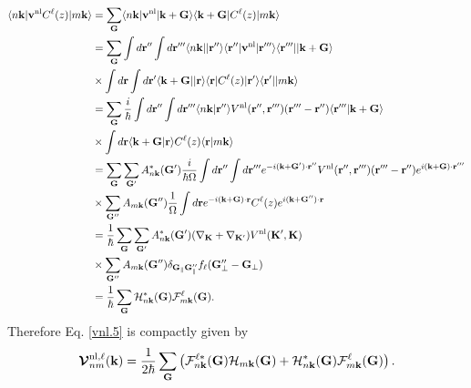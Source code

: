\documentclass[letterpaper,aps]{revtex4}
\begin{document}
\begin{align}\label{vnl.12}
\langle n\mathbf{k} |
\mathbf{v}^\mathrm{nl}
C^\ell(z) | m\mathbf{k} \rangle
&=\sum_{\mathbf{G}}
\langle n\mathbf{k} |
\mathbf{v}^\mathrm{nl} 
| \mathbf{k}+\mathbf{G} \rangle
\langle \mathbf{k}+\mathbf{G} |C^\ell(z)
| m\mathbf{k} \rangle
\nonumber\\
&=\sum_{\mathbf{G}}
\int d\mathbf{r}'' 
\int d\mathbf{r}''' 
\langle n\mathbf{k} |
| \mathbf{r}'' \rangle\langle \mathbf{r}'' | 
\mathbf{v}^\mathrm{nl} 
| \mathbf{r}''' \rangle\langle \mathbf{r}''' | 
| \mathbf{k}+\mathbf{G} \rangle
\nonumber\\
&\times 
\int d\mathbf{r} 
\int d\mathbf{r}' 
\langle \mathbf{k}+\mathbf{G} |
| \mathbf{r} \rangle\langle \mathbf{r} |  
C^\ell(z) 
| \mathbf{r}' \rangle\langle \mathbf{r}' |
| m\mathbf{k} \rangle
\nonumber\\
&=\sum_{\mathbf{G}}
\frac{i}{\hbar}
\int d\mathbf{r}'' 
\int d\mathbf{r}''' 
\langle {n\mathbf{k}} | {\mathbf{r}''} \rangle
V^\mathrm{nl}(\mathbf{r}'',\mathbf{r}''')(\mathbf{r}'''-\mathbf{r}'') 
\langle {\mathbf{r}'''} | {\mathbf{k}+\mathbf{G}} \rangle
\nonumber\\
&\times 
\int d\mathbf{r} 
\langle {\mathbf{k}+\mathbf{G}} | {\mathbf{r}} \rangle
C^\ell(z) 
\langle {\mathbf{r}} | {m\mathbf{k}} \rangle
\nonumber\\
&=\sum_{\mathbf{G}}
\sum_{\mathbf{G}'}
A^*_{n\mathbf{k}}(\mathbf{G}') 
\frac{i}{\hbar\Omega}
\int d\mathbf{r}'' 
\int d\mathbf{r}''' 
e^{-i(\mathbf{k}+\mathbf{G}')\cdot\mathbf{r}''} 
V^\mathrm{nl}(\mathbf{r}'',\mathbf{r}''')(\mathbf{r}'''-\mathbf{r}'') 
e^{i(\mathbf{k}+\mathbf{G})\cdot\mathbf{r}'''}
\nonumber\\
&\times 
\sum_{\mathbf{G}''}
A_{m\mathbf{k}}(\mathbf{G}'') 
\frac{1}{\Omega}
\int d\mathbf{r} 
e^{-i(\mathbf{k}+\mathbf{G})\cdot\mathbf{r}} 
C^\ell(z) 
e^{i(\mathbf{k}+\mathbf{G}'')\cdot\mathbf{r}}
\nonumber\\
&=
\frac{1}{\hbar}
\sum_{\mathbf{G}}
\sum_{\mathbf{G}'}
A^*_{n\mathbf{k}}(\mathbf{G}') 
(\nabla_\mathbf{K}+\nabla_{\mathbf{K}'})
V^\mathrm{nl}(\mathbf{K}',\mathbf{K})
\nonumber\\
&\times 
\sum_{\mathbf{G}''}
A_{m\mathbf{k}}(\mathbf{G}'') 
\delta_{\mathbf{G}_\parallel \mathbf{G}''_\parallel}f_\ell(\mathbf{G}''_\perp-\mathbf{G}_\perp)
\nonumber\\
&=
\frac{1}{\hbar}
\sum_{\mathbf{G}}
{\cal H}^*_{n\mathbf{k}}(\mathbf{G}) 
{\cal F}^\ell_{m\mathbf{k}}(\mathbf{G}) 
.
\end{align}
Therefore Eq. \eqref{vnl.5} is compactly given by
\begin{align}\label{vnl.13}
\boldsymbol{\mathcal{V}}^{\mathrm{nl},\ell}_{nm}(\mathbf{k})=\frac{1}{2 \hbar}
\sum_{\mathbf{G}}
\left(
{\cal F}^{\ell*}_{n\mathbf{k}}(\mathbf{G}) 
{\cal H}_{m\mathbf{k}}(\mathbf{G}) 
+
{\cal H}^*_{n\mathbf{k}}(\mathbf{G}) 
{\cal F}^\ell_{m\mathbf{k}}(\mathbf{G}) 
\right)
.
\end{align} 
\end{document}
